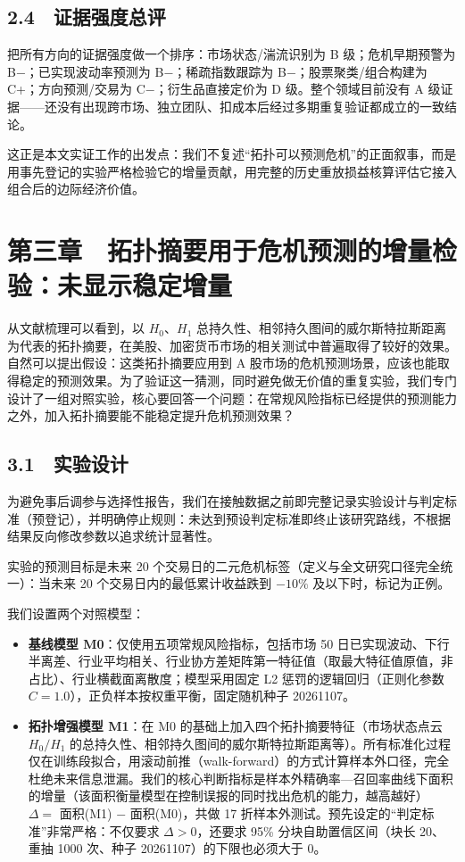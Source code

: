 \documentclass[12pt,a4paper]{ctexart}
\begin{document}
\subsection{2.4　证据强度总评}
把所有方向的证据强度做一个排序：市场状态/湍流识别为 B 级；危机早期预警为 B\(-\)；已实现波动率预测为 B\(-\)；稀疏指数跟踪为 B\(-\)；股票聚类/组合构建为 C+；方向预测/交易为 C\(-\)；衍生品直接定价为 D 级。整个领域目前没有 A 级证据——还没有出现跨市场、独立团队、扣成本后经过多期重复验证都成立的一致结论。\par
这正是本文实证工作的出发点：我们不复述“拓扑可以预测危机”的正面叙事，而是用事先登记的实验严格检验它的增量贡献，用完整的历史重放损益核算评估它接入组合后的边际经济价值。\par

\section{第三章　拓扑摘要用于危机预测的增量检验：未显示稳定增量}
从文献梳理可以看到，以 \(H_0\)、\(H_1\) 总持久性、相邻持久图间的威尔斯特拉斯距离为代表的拓扑摘要，在美股、加密货币市场的相关测试中普遍取得了较好的效果。自然可以提出假设：这类拓扑摘要应用到 A 股市场的危机预测场景，应该也能取得稳定的预测效果。为了验证这一猜测，同时避免做无价值的重复实验，我们专门设计了一组对照实验，核心要回答一个问题：在常规风险指标已经提供的预测能力之外，加入拓扑摘要能不能稳定提升危机预测效果？\par
\subsection{3.1　实验设计}
为避免事后调参与选择性报告，我们在接触数据之前即完整记录实验设计与判定标准（预登记），并明确停止规则：未达到预设判定标准即终止该研究路线，不根据结果反向修改参数以追求统计显著性。\par
实验的预测目标是未来 20 个交易日的二元危机标签（定义与全文研究口径完全统一）：当未来 20 个交易日内的最低累计收益跌到 \(-10\%\) 及以下时，标记为正例。\par
我们设置两个对照模型：\par
\begin{itemize}
\item \textbf{基线模型 M0}：仅使用五项常规风险指标，包括市场 50 日已实现波动、下行半离差、行业平均相关、行业协方差矩阵第一特征值（取最大特征值原值，非占比）、行业横截面离散度；模型采用固定 L2 惩罚的逻辑回归（正则化参数 \(C = 1.0\)），正负样本按权重平衡，固定随机种子 20261107。
\item \textbf{拓扑增强模型 M1}：在 M0 的基础上加入四个拓扑摘要特征（市场状态点云 \(H_0/H_1\) 的总持久性、相邻持久图间的威尔斯特拉斯距离等）。所有标准化过程仅在训练段拟合，用滚动前推（walk-forward）的方式计算样本外口径，完全杜绝未来信息泄漏。我们的核心判断指标是样本外精确率—召回率曲线下面积的增量（该面积衡量模型在控制误报的同时找出危机的能力，越高越好） \(\Delta =\) 面积(M1) \(-\) 面积(M0)，共做 17 折样本外测试。预先设定的“判定标准”非常严格：不仅要求 \(\Delta > 0\)，还要求 95\% 分块自助置信区间（块长 20、重抽 1000 次、种子 20261107）的下限也必须大于 0。
\end{itemize}
\end{document}
